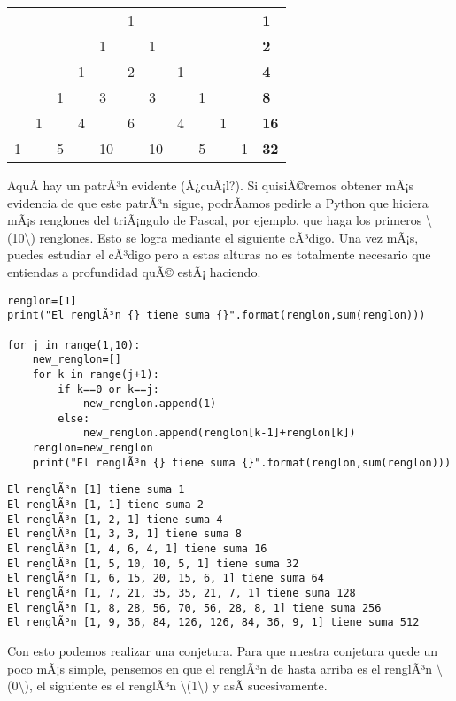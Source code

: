 \documentclass[
]{article}
\begin{document}
\begin{longtable}[]{@{}llllllllllll@{}}
\toprule\noalign{}
& & & & & & & & & & & \\
\midrule\noalign{}
\endhead
\bottomrule\noalign{}
\endlastfoot
& & & & & 1 & & & & & & \textbf{1} \\
& & & & 1 & & 1 & & & & & \textbf{2} \\
& & & 1 & & 2 & & 1 & & & & \textbf{4} \\
& & 1 & & 3 & & 3 & & 1 & & & \textbf{8} \\
& 1 & & 4 & & 6 & & 4 & & 1 & & \textbf{16} \\
1 & & 5 & & 10 & & 10 & & 5 & & 1 & \textbf{32} \\
\end{longtable}

AquÃ­ hay un patrÃ³n evidente (Â¿cuÃ¡l?). Si quisiÃ©remos obtener mÃ¡s
evidencia de que este patrÃ³n sigue, podrÃ­amos pedirle a Python que
hiciera mÃ¡s renglones del triÃ¡ngulo de Pascal, por ejemplo, que haga
los primeros {\textbackslash(10\textbackslash)} renglones. Esto se logra
mediante el siguiente cÃ³digo. Una vez mÃ¡s, puedes estudiar el cÃ³digo
pero a estas alturas no es totalmente necesario que entiendas a
profundidad quÃ© estÃ¡ haciendo.

\begin{verbatim}
renglon=[1]
print("El renglÃ³n {} tiene suma {}".format(renglon,sum(renglon)))

for j in range(1,10):
    new_renglon=[]
    for k in range(j+1):
        if k==0 or k==j:
            new_renglon.append(1)
        else:
            new_renglon.append(renglon[k-1]+renglon[k])
    renglon=new_renglon
    print("El renglÃ³n {} tiene suma {}".format(renglon,sum(renglon)))
\end{verbatim}

\begin{verbatim}
El renglÃ³n [1] tiene suma 1
El renglÃ³n [1, 1] tiene suma 2
El renglÃ³n [1, 2, 1] tiene suma 4
El renglÃ³n [1, 3, 3, 1] tiene suma 8
El renglÃ³n [1, 4, 6, 4, 1] tiene suma 16
El renglÃ³n [1, 5, 10, 10, 5, 1] tiene suma 32
El renglÃ³n [1, 6, 15, 20, 15, 6, 1] tiene suma 64
El renglÃ³n [1, 7, 21, 35, 35, 21, 7, 1] tiene suma 128
El renglÃ³n [1, 8, 28, 56, 70, 56, 28, 8, 1] tiene suma 256
El renglÃ³n [1, 9, 36, 84, 126, 126, 84, 36, 9, 1] tiene suma 512
\end{verbatim}

Con esto podemos realizar una conjetura. Para que nuestra conjetura
quede un poco mÃ¡s simple, pensemos en que el renglÃ³n de hasta arriba
es el renglÃ³n {\textbackslash(0\textbackslash)}, el siguiente es el
renglÃ³n {\textbackslash(1\textbackslash)} y asÃ­ sucesivamente.
\end{document}
